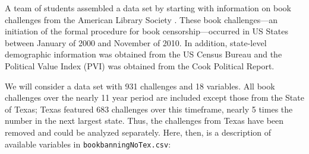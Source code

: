 \documentclass[
]{krantz}
\begin{document}
\begin{enumerate}
  A team of students assembled a data set by starting with information on book challenges from the American Library Society \citep{Fast2011}. These book challenges---an initiation of the formal procedure for book censorship---occurred in US States between January of 2000 and November of 2010. In addition, state-level demographic information was obtained from the US Census Bureau and the Political Value Index (PVI) was obtained from the Cook Political Report.

  We will consider a data set with 931 challenges and 18 variables. All book challenges over the nearly 11 year period are included except those from the State of Texas; Texas featured 683 challenges over this timeframe, nearly 5 times the number in the next largest state. Thus, the challenges from Texas have been removed and could be analyzed separately. Here, then, is a description of available variables in \texttt{bookbanningNoTex.csv}:


\end{enumerate}
\end{document}

